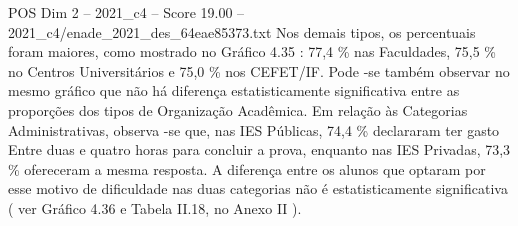 \begin{textsample}{POS Dim 2 – 2021\_c4 – Score 19.00 – 2021\_c4/enade\_2021\_des\_64eae85373.txt}
Nos demais tipos, os percentuais foram maiores, como mostrado no Gráfico 4.35 : 77,4 \% nas Faculdades, 75,5 \% no Centros Universitários e 75,0 \% nos CEFET/IF.
Pode -se também observar no mesmo gráfico que não há diferença estatisticamente significativa entre as proporções dos tipos de Organização Acadêmica.
Em relação às Categorias Administrativas, observa -se que, nas IES Públicas, 74,4 \% declararam ter gasto Entre duas e quatro horas para concluir a prova, enquanto nas IES Privadas, 73,3 \% ofereceram a mesma resposta.
A diferença entre os alunos que optaram por esse motivo de dificuldade nas duas categorias não é estatisticamente significativa ( ver Gráfico 4.36 e Tabela II.18, no Anexo II ).

\end{textsample}
